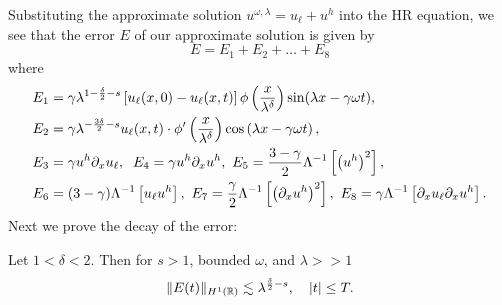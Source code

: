 Substituting the
approximate solution $u^{\omega, \lambda} = u_\ell + u^h$ into the HR
equation, we see that the error
$E$ of our approximate solution is given by
%
%
\begin{equation*}
E=E_1 + E_2 + \dots + E_8
\end{equation*}
%
%
where
%
%
\begin{equation}
\label{all_errors_together}
\begin{split}
E_1 & = \gamma \lambda^{1 -\frac{\delta}{2}-s}  \left[ u_\ell(x,0) - u_\ell(x,t)
\right] \phi\left(
\frac{x}{\lambda^ \delta}
\right)\sin(\lambda x - \gamma \omega t),
\\
E_2 & = \gamma \lambda^{-\frac{3\delta}{2}-s}
u_\ell(x,t) \cdot \phi'\left( \frac{x}{\lambda^\delta} \right)\cos\left( \lambda
x - \gamma \omega t
\right),
\\
E_3 & = \gamma u^h \p_x u_\ell, \; \; E_4 = \gamma u^h \p_x u^h, \ E_5  = 
\frac{3-\gamma}{2} \Lambda^{-1} \left[  \left( u^h \right)^2 \right], \\
E_6 & = (3- \gamma)\Lambda^{-1}
\left[ u_\ell u^h \right], \  E_7 = \frac{\gamma}{2} \Lambda^{-1} \left[ 
\left(
\p_x u^h \right)^2 \right ], \ E_8 = \gamma \Lambda^{-1} \left[  \p_x u_\ell \p_x u^h \right].
\end{split}
\end{equation}
%
%
%
Next we prove the decay of the error:
%
%
\begin{proposition}
Let $1<\delta<2$. Then for $s > 1$, bounded $\omega$, and
$\lambda >>1$ %
%
%
\begin{equation}
\label{E-est}
\|E(t)\|_{H^1(\mathbb{R})} \lesssim \lambda^{\frac{\delta}{2} -s}, \quad |t| \le 
T.
\end{equation}
%
%
%
\end{proposition}
%
%
%
